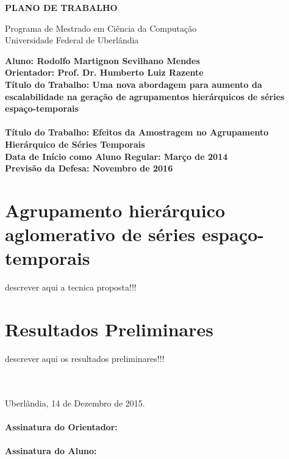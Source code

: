 \documentclass[12pt]{article}
\begin{document}
\begin{center}
    \bf{
        \LARGE{PLANO DE TRABALHO}
        \\ $\ $\\
    }
    
    \Large{
        Programa de Mestrado em Ciência da Computação\\
        Universidade Federal de Uberlândia
    }
    \\ $\ $\\
\end{center}

\begin{center}
    \bf{
        Aluno: Rodolfo Martignon Sevilhano Mendes\\ $\ $\\
        Orientador: Prof. Dr. Humberto Luiz Razente\\ $\ $\\
        Título do Trabalho: Uma nova abordagem para aumento da escalabilidade na
				geração de agrupamentos hierárquicos de séries espaço-temporais\\ \ \ \\
        Título do Trabalho: Efeitos da Amostragem no Agrupamento \\
				Hierárquico de Séries Temporais\\ $\ $\\
        Data de Início como Aluno Regular: Março de 2014\\ $\ $\\
        Previsão da Defesa: Novembro de 2016\\ $\ $\\
    }
\end{center}






\section{Agrupamento hierárquico aglomerativo de séries espaço-temporais}

descrever aqui a tecnica proposta!!!

\section{Resultados Preliminares}

descrever aqui os resultados preliminares!!!





\ \\
\ \\
\noindent Uberlândia, 14 de Dezembro de 2015.\\

\ \\
\noindent \textbf{Assinatura do Orientador:} \\

\ \\
\noindent \textbf{Assinatura do Aluno:}


\end{document}
